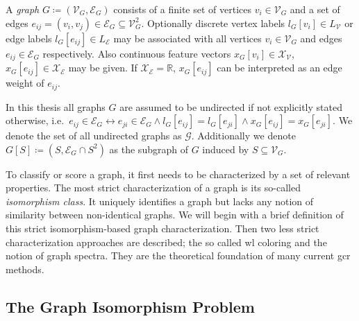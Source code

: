 \begin{defn}
	A \textit{graph} $G \coloneqq (\mathcal{V}_G, \mathcal{E}_G)$ consists of a finite set of vertices $v_i \in \mathcal{V}_G$ and a set of edges $e_{ij} = (v_i, v_j) \in \mathcal{E}_G \subseteq \mathcal{V}_G^2$.
	Optionally discrete vertex labels $l_G[v_i] \in L_{\mathcal{V}}$ or edge labels $l_G[e_{ij}] \in L_{\mathcal{E}}$ may be associated with all vertices $v_i \in \mathcal{V}_G$ and edges $e_{ij}\in \mathcal{E}_G$ respectively.
	Also continuous feature vectors $x_G[v_{i}] \in \mathcal{X}_{\mathcal{V}}$, $x_G[e_{ij}] \in \mathcal{X}_{\mathcal{E}}$ may be given.
	If $\mathcal{X}_{\mathcal{E}} = \mathbb{R}$, $x_G[e_{ij}]$ can be interpreted as an edge weight of $e_{ij}$.

	In this thesis all graphs $G$ are assumed to be undirected if not explicitly stated otherwise, i.e.\ ${e_{ij} \in \mathcal{E}_G} \leftrightarrow\allowbreak {e_{ji} \in \mathcal{E}_G} \allowbreak\land l_G[e_{ij}] = l_G[e_{ji}] \allowbreak\land x_G[e_{ij}] = x_G[e_{ji}]$.
	We denote the set of all undirected graphs as $\mathcal{G}$.
	Additionally we denote $G[S] \coloneqq (S, \mathcal{E}_G \cap S^2)$ as the subgraph of $G$ induced by $S \subseteq \mathcal{V}_G$.
\end{defn}
To classify or score a graph, it first needs to be characterized by a set of relevant properties.
The most strict characterization of a graph is its so-called \textit{isomorphism class}.
It uniquely identifies a graph but lacks any notion of similarity between non-identical graphs.
We will begin with a brief definition of this strict isomorphism-based graph characterization.
Then two less strict characterization approaches are described; the so called \acl{wl} coloring and the notion of graph spectra.
They are the theoretical foundation of many current \ac{gcr} methods.

\subsection{The Graph Isomorphism Problem}%
\label{sec:related:character:iso}

